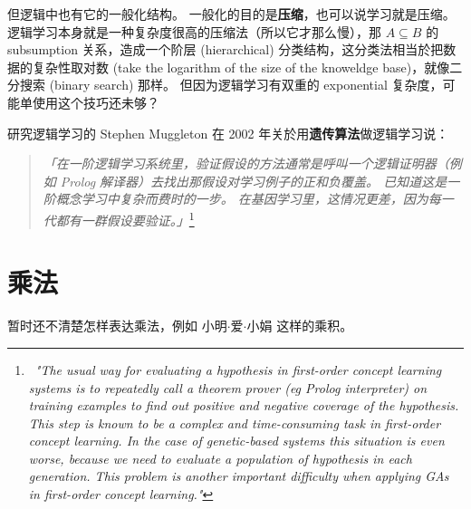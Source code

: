 \documentclass[12pt]{article}
\newcommand{\formula}[1]{\textcolor{LogicColor}{#1}}
\begin{document}
但逻辑中也有它的一般化结构。  一般化的目的是\textbf{压缩}，也可以说学习就是压缩。  逻辑学习本身就是一种复杂度很高的压缩法（所以它才那么慢），那 $A \subseteq B$ 的 subsumption 关系，造成一个阶层 (hierarchical) 分类结构，这分类法相当於把数据的复杂性取对数 (take the logarithm of the size of the knoweldge base)，就像二分搜索 (binary search) 那样。  但因为逻辑学习有双重的 exponential 复杂度，可能单使用这个技巧还未够？

研究逻辑学习的 Stephen Muggleton 在 2002 年关於用\textbf{遗传算法}做逻辑学习说：
\begin{quote}
\textit{「在一阶逻辑学习系统里，验证假设的方法通常是呼叫一个逻辑证明器（例如 Prolog 解译器）去找出那假设对学习例子的正和负覆盖。  已知道这是一阶概念学习中复杂而费时的一步。 在基因学习里，这情况更差，因为每一代都有一群假设要验证。」}\footnote{\, \textit{"The usual way for evaluating a hypothesis in first-order concept learning systems is to repeatedly call a theorem prover (eg Prolog interpreter) on training examples to find out positive and negative coverage of the hypothesis.  This step is known to be a complex and time-consuming task in first-order concept learning.  In the case of genetic-based systems this situation is even worse, because we need to evaluate a population of hypothesis in each generation.  This problem is another important difficulty when applying GAs in first-order concept learning."}}
\end{quote}

\section{乘法}

暂时还不清楚怎样表达乘法，例如 \formula{小明$\cdot$爱$\cdot$小娟} 这样的乘积。 
\end{document}
